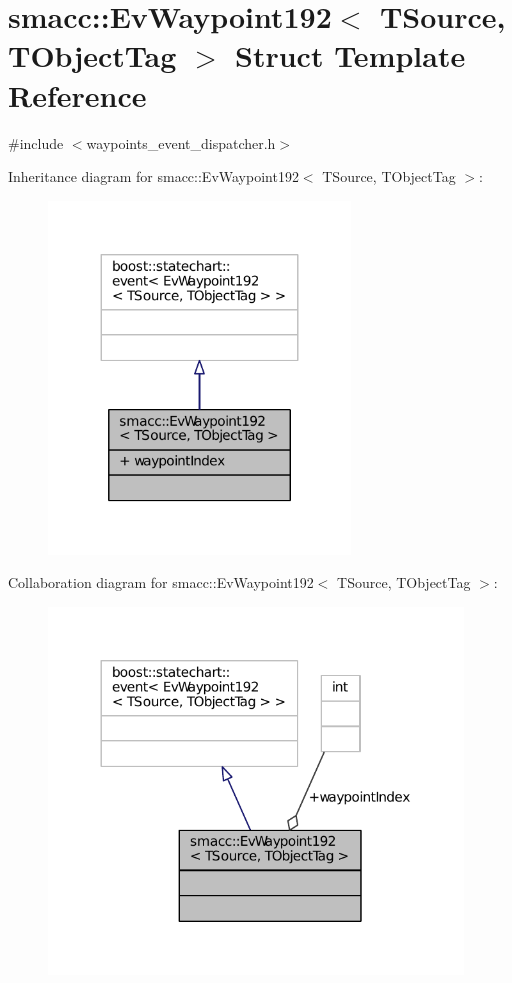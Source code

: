 \hypertarget{structsmacc_1_1EvWaypoint192}{}\section{smacc\+:\+:Ev\+Waypoint192$<$ T\+Source, T\+Object\+Tag $>$ Struct Template Reference}
\label{structsmacc_1_1EvWaypoint192}


{\ttfamily \#include $<$waypoints\+\_\+event\+\_\+dispatcher.\+h$>$}



Inheritance diagram for smacc\+:\+:Ev\+Waypoint192$<$ T\+Source, T\+Object\+Tag $>$\+:
\nopagebreak
\begin{figure}[H]
\begin{center}
\leavevmode
\includegraphics[width=227pt]{structsmacc_1_1EvWaypoint192__inherit__graph}
\end{center}
\end{figure}


Collaboration diagram for smacc\+:\+:Ev\+Waypoint192$<$ T\+Source, T\+Object\+Tag $>$\+:
\nopagebreak
\begin{figure}[H]
\begin{center}
\leavevmode
\includegraphics[width=312pt]{structsmacc_1_1EvWaypoint192__coll__graph}
\end{center}
\end{figure}
